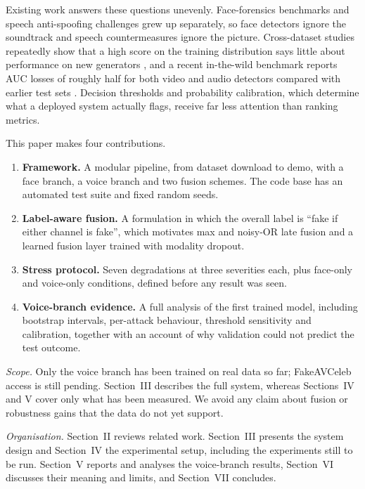 \documentclass[conference]{IEEEtran}
\begin{document}
Existing work answers these questions unevenly. Face-forensics benchmarks \cite{rossler2019ff,li2020celebdf,dolhansky2020dfdc} and speech anti-spoofing challenges \cite{wang2020asvspoof} grew up separately, so face detectors ignore the soundtrack and speech countermeasures ignore the picture. Cross-dataset studies repeatedly show that a high score on the training distribution says little about performance on new generators \cite{yan2023deepfakebench,muller2022generalize}, and a recent in-the-wild benchmark reports AUC losses of roughly half for both video and audio detectors compared with earlier test sets \cite{chandra2025evaluation}. Decision thresholds and probability calibration, which determine what a deployed system actually flags, receive far less attention than ranking metrics.

This paper makes four contributions.
\begin{enumerate}
\item \textbf{Framework.} A modular pipeline, from dataset download to demo, with a face branch, a voice branch and two fusion schemes. The code base has an automated test suite and fixed random seeds.
\item \textbf{Label-aware fusion.} A formulation in which the overall label is ``fake if either channel is fake'', which motivates max and noisy-OR late fusion and a learned fusion layer trained with modality dropout.
\item \textbf{Stress protocol.} Seven degradations at three severities each, plus face-only and voice-only conditions, defined before any result was seen.
\item \textbf{Voice-branch evidence.} A full analysis of the first trained model, including bootstrap intervals, per-attack behaviour, threshold sensitivity and calibration, together with an account of why validation could not predict the test outcome.
\end{enumerate}

\emph{Scope.} Only the voice branch has been trained on real data so far; FakeAVCeleb access is still pending. Section~III describes the full system, whereas Sections~IV and V cover only what has been measured. We avoid any claim about fusion or robustness gains that the data do not yet support.

\emph{Organisation.} Section~II reviews related work. Section~III presents the system design and Section~IV the experimental setup, including the experiments still to be run. Section~V reports and analyses the voice-branch results, Section~VI discusses their meaning and limits, and Section~VII concludes.
\end{document}
